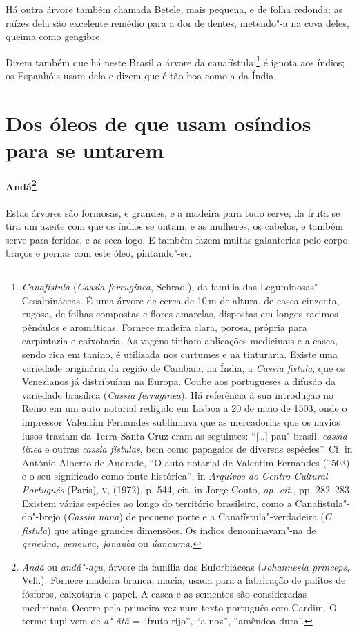  Há outra árvore também chamada Betele, mais pequena, e de folha
redonda; as raízes dela são excelente remédio para a dor de dentes,
metendo"-a na cova deles, queima como gengibre.
 
Dizem também que há neste Brasil a árvore da \mbox{canafístula};\footnote{ \textit{Canafístula} 
(\textit{Cassia ferruginea}, Schrad.), da família das
Leguminosas"-Cesalpináceas. É uma árvore de cerca de 10\,m de altura, de
casca cinzenta, rugosa, de folhas compostas e flores amarelas,
dispostas em longos racimos pêndulos e aromáticas. Fornece madeira
clara, porosa, própria para carpintaria e caixotaria. As vagens tinham
aplicações medicinais e a casca, sendo rica em tanino, é utilizada nos
curtumes e na tinturaria. Existe uma variedade originária da região de
Cambaia, na Índia, a \textit{Cassia fistula}, que os Venezianos já
distribuíam na Europa. Coube aos portugueses a difusão da variedade
brasílica (\textit{Cassia ferruginea}). Há referência à sua introdução
no Reino em um auto notarial redigido em Lisboa a 20 de maio de 1503,
onde o impressor Valentim Fernandes sublinhava que as mercadorias que
os navios lusos traziam da Terra Santa Cruz eram as seguintes: 
``[\ldots{}] pau"-brasil, \textit{cassia linea} e outras \textit{cassia
fístulas}, bem como papagaios de diversas espécies''. Cf. in António
Alberto de Andrade, ``O auto notarial de Valentim Fernandes (1503) e o
seu significado como fonte histórica'', in \textit{Arquivos do Centro
Cultural Português} (Paris), \textsc{v}, (1972), p. 544, cit. in Jorge Couto,
\textit{op. cit.}, pp. 282--283. Existem várias espécies ao longo do
território brasileiro, como a Canafístula"-do"-brejo (\textit{Cassia
nana}) de pequeno porte e a Canafístula"-verdadeira (\textit{C.
fistula}) que atinge grandes dimensões. Os índios denominavam"-na de
\textit{geneúna, geneuva, janauba} ou \textit{úanauma.}} é ignota aos
índios; os Espanhóis usam dela e dizem que é tão boa como a da Índia.

\section[Dos óleos de que usam os índios para se untarem]{Dos óleos de que usam os\break índios para se untarem}
\paragraph{Andá\footnote{ \textit{Andá} ou \textit{andá"-açu}, 
árvore da família das Euforbiáceas (\textit{Johannesia princeps}, Vell.). 
Fornece madeira branca, macia, usada para a fabricação de
palitos de fósforos, caixotaria e papel. A casca e as sementes são
consideradas medicinais. Ocorre pela primeira vez num texto português
com Cardim. O termo tupi vem de \textit{a"-ãtã} = ``fruto rijo'', ``a noz'',
``amêndoa dura''.}} Estas árvores são formosas, e grandes, e
a madeira para tudo serve; da fruta se tira um azeite com que os índios
se untam, e as mulheres, os cabelos, e também serve para feridas, e as
seca logo. E também fazem muitas galanterias pelo corpo, braços e
pernas com este óleo, pintando"-se.

